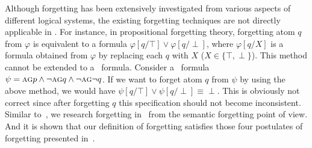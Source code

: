 \documentclass[letterpaper]{article} %
\begin{document}
Although forgetting has been extensively investigated from various aspects of different logical systems, the existing forgetting techniques are not directly applicable in \CTL.
For instance, in propositional forgetting theory, forgetting atom $q$ from $\varphi$ is equivalent to a formula $\varphi[q/\top] \vee \varphi[q/\perp]$, where $\varphi[q/X]$ is a formula obtained from $\varphi$ by replacing each $q$ with $X$ ($X\in \{\top, \perp\}$).
This method cannot be extended to a \CTL\ formula. Consider a \CTL\ formula $\psi=\textsc{a}\textsc{g} p \wedge \neg \textsc{a}\textsc{g} q \wedge \neg \textsc{a}\textsc{g} \neg q$. If we want to forget
atom $q$ from $\psi$ by using the above method, we would have $\psi[q/\top] \vee \psi[q/\perp] \equiv \perp$. This is obviously not correct since after forgetting $q$ this specification should
not become inconsistent.
Similar to~\cite{Yan:AIJ:2009}, we research forgetting in \CTL\ from the semantic forgetting point of view.
And it is shown that our definition of forgetting satisfies those four postulates of forgetting presented in~\cite{Yan:AIJ:2009}.
\end{document}
